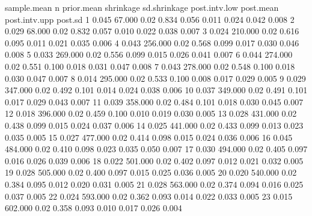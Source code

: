 \documentclass[article]{jss}
\begin{document}
\begin{CodeChunk}
\begin{CodeOutput}
           sample.mean        n prior.mean shrinkage sd.shrinkage post.intv.low post.mean post.intv.upp post.sd
1                0.045   67.000       0.02     0.834        0.056         0.011     0.024         0.042   0.008
2                0.029   68.000       0.02     0.832        0.057         0.010     0.022         0.038   0.007
3                0.024  210.000       0.02     0.616        0.095         0.011     0.021         0.035   0.006
4                0.043  256.000       0.02     0.568        0.099         0.017     0.030         0.046   0.008
5                0.033  269.000       0.02     0.556        0.099         0.015     0.026         0.041   0.007
6                0.044  274.000       0.02     0.551        0.100         0.018     0.031         0.047   0.008
7                0.043  278.000       0.02     0.548        0.100         0.018     0.030         0.047   0.007
8                0.014  295.000       0.02     0.533        0.100         0.008     0.017         0.029   0.005
9                0.029  347.000       0.02     0.492        0.101         0.014     0.024         0.038   0.006
10               0.037  349.000       0.02     0.491        0.101         0.017     0.029         0.043   0.007
11               0.039  358.000       0.02     0.484        0.101         0.018     0.030         0.045   0.007
12               0.018  396.000       0.02     0.459        0.100         0.010     0.019         0.030   0.005
13               0.028  431.000       0.02     0.438        0.099         0.015     0.024         0.037   0.006
14               0.025  441.000       0.02     0.433        0.099         0.013     0.023         0.035   0.005
15               0.027  477.000       0.02     0.414        0.098         0.015     0.024         0.036   0.006
16               0.045  484.000       0.02     0.410        0.098         0.023     0.035         0.050   0.007
17               0.030  494.000       0.02     0.405        0.097         0.016     0.026         0.039   0.006
18               0.022  501.000       0.02     0.402        0.097         0.012     0.021         0.032   0.005
19               0.028  505.000       0.02     0.400        0.097         0.015     0.025         0.036   0.005
20               0.020  540.000       0.02     0.384        0.095         0.012     0.020         0.031   0.005
21               0.028  563.000       0.02     0.374        0.094         0.016     0.025         0.037   0.005
22               0.024  593.000       0.02     0.362        0.093         0.014     0.022         0.033   0.005
23               0.015  602.000       0.02     0.358        0.093         0.010     0.017         0.026   0.004

\end{CodeOutput}
\end{CodeChunk}
\end{document}
